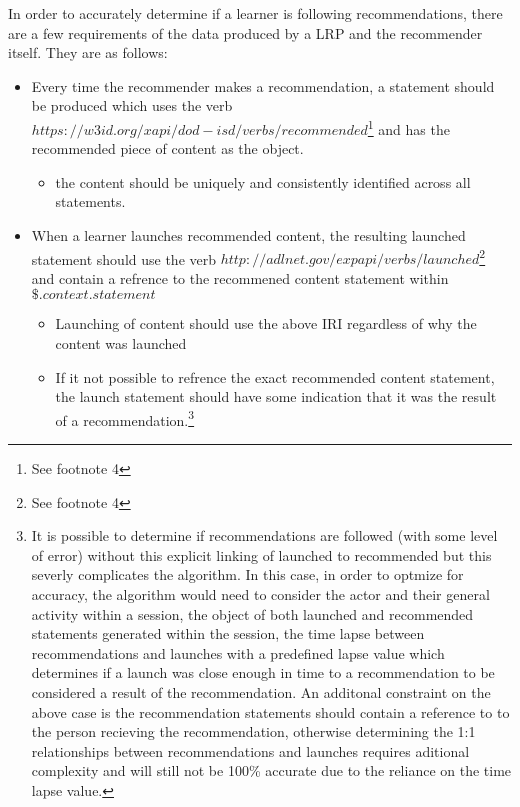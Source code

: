 \documentclass{article}
\begin{document}
In order to accurately determine if a learner is following
recommendations, there are a few requirements of the data produced by
a LRP and the recommender itself. They are as follows:

\begin{itemize}
\item Every time the recommender makes a recommendation, a statement
  should be produced which uses the verb
  $https://w3id.org/xapi/dod-isd/verbs/recommended$\footnote{\label{RecommendedIRI}
  See footnote 4} and has the
  recommended piece of content as the object.
  \begin{itemize}
    \item the content should be uniquely and consistently identified
      across all statements.
    \end{itemize}
\item When a learner launches recommended content, the resulting
  launched statement should use the verb
  $http://adlnet.gov/expapi/verbs/launched$\footnote{\label{LaunchedIRI}
  See footnote 4} and contain a refrence to the recommened content statement within
  $\$.context.statement$
  \begin{itemize}
    \item Launching of content should use the above IRI regardless of
      why the content was launched
    \item If it not possible to refrence the exact recommended content
      statement, the launch statement should have some indication that
      it was the result of a recommendation.\footnote{\label{Recommendations} It is
    possible to determine if recommendations are followed (with some
    level of error) without this explicit linking of launched to
    recommended but this severly complicates the algorithm. In this
    case, in order to optmize for accuracy, the algorithm would need
    to consider the actor and their general activity within a session,
    the object of both launched and recommended statements generated
    within the session, the time lapse between recommendations and
    launches with a predefined lapse value which determines if a
    launch was close enough in time to a recommendation to be
    considered a result of the recommendation. An additonal constraint
    on the above case is the recommendation statements should contain
    a reference to to the person recieving the recommendation,
    otherwise determining the 1:1 relationships between recommendations and
    launches requires aditional complexity and will still not be 100\%
    accurate due to the reliance on the time lapse value.}
  \end{itemize}
\end{itemize}
\end{document}
